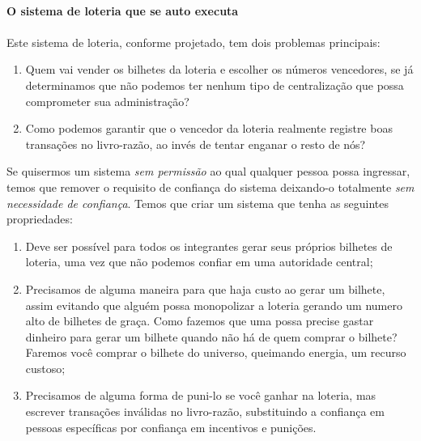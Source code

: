 \paragraph{O sistema de loteria que se auto executa}
\paragraph{}
Este sistema de loteria, conforme projetado, tem dois problemas principais:

\begin{samepage}
\begin{enumerate}
\item Quem vai vender os bilhetes da loteria e escolher os números vencedores, se já determinamos que não podemos ter nenhum tipo de centralização que possa comprometer sua administração?
\item Como podemos garantir que o vencedor da loteria realmente registre boas transações no livro-razão, ao invés de tentar enganar o resto de nós?
\end{enumerate}
\end{samepage}

Se quisermos um sistema \textit{sem permissão} ao qual qualquer pessoa possa ingressar, temos que remover o requisito de confiança do sistema deixando-o totalmente \textit{sem necessidade de confiança}. Temos que criar um sistema que tenha as seguintes propriedades:

\begin{samepage}
\begin{enumerate}
\item Deve ser possível para todos os integrantes gerar seus próprios bilhetes de loteria, uma vez que não podemos confiar em uma autoridade central;%
\item Precisamos de alguma maneira para que haja custo ao gerar um bilhete, assim evitando que alguém possa monopolizar a loteria gerando um numero alto de bilhetes de graça. Como fazemos que uma possa precise gastar dinheiro para gerar um bilhete quando não há de quem comprar o bilhete? Faremos você comprar o bilhete do universo, queimando energia, um recurso custoso;
\item %



Precisamos de alguma forma de puni-lo se você ganhar na loteria, mas escrever transações inválidas no livro-razão, substituindo a confiança em pessoas específicas por confiança em incentivos e punições.
\end{enumerate}
\end{samepage}

